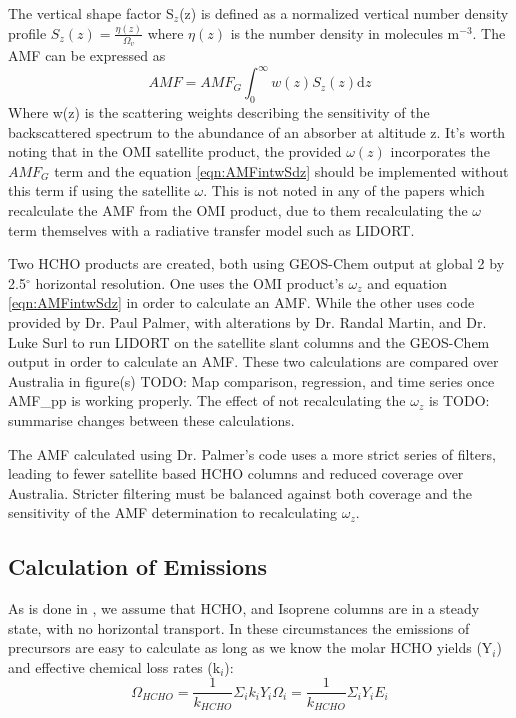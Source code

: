 \documentclass[acp, manuscript]{copernicus} %
\begin{document}
    The vertical shape factor S$_z$(z) is defined as a normalized vertical number density profile $S_z(z) = \frac{\eta(z)}{\Omega_v}$ where $\eta(z)$ is the number density in molecules m$^{-3}$. 
    The AMF can be expressed as
    \begin{equation} \label{eqn:AMFintwSdz}
      AMF = AMF_G \int_0^\infty w(z) S_z(z) \mathrm{d}z
    \end{equation}
    Where w(z) is the scattering weights describing the sensitivity of the backscattered spectrum to the abundance of an absorber at altitude z.
    It's worth noting that in the OMI satellite product, the provided $\omega(z)$ incorporates the $AMF_G$ term and the equation \ref{eqn:AMFintwSdz} should be implemented without this term if using the satellite $\omega$.
    This is not noted in any of the papers which recalculate the AMF from the OMI product, due to them recalculating the $\omega$ term themselves with a radiative transfer model such as LIDORT.
    
    Two HCHO products are created, both using GEOS-Chem output at global 2 by 2.5$^{\circ}$ horizontal resolution.
    One uses the OMI product's $\omega_z$ and equation \ref{eqn:AMFintwSdz} in order to calculate an AMF.
    While the other uses code provided by Dr. Paul Palmer, with alterations by Dr. Randal Martin, and Dr. Luke Surl to run LIDORT on the satellite slant columns and the GEOS-Chem output in order to calculate an AMF.
    These two calculations are compared over Australia in figure(s) TODO: Map comparison, regression, and time series once AMF_pp is working properly.
    The effect of not recalculating the $\omega_z$ is TODO: summarise changes between these calculations.
    
    The AMF calculated using Dr. Palmer's code uses a more strict series of filters, leading to fewer satellite based HCHO columns and reduced coverage over Australia.
    Stricter filtering must be balanced against both coverage and the sensitivity of the AMF determination to recalculating $\omega_z$.
    
  
  \subsection{Calculation of Emissions}
    \label{sec:EmissionCalculation}
    
    As is done in \citet{Palmer2003, Millet2006, Bauwens2016}, we assume that HCHO, and Isoprene columns are in a steady state, with no horizontal transport.
    In these circumstances the emissions of precursors are easy to calculate as long as we know the molar HCHO yields (Y$_i$) and effective chemical loss rates (k$_i$):
    \begin{equation}
      \Omega_{HCHO} = \frac{1}{k_{HCHO}}\Sigma_i k_i Y_i \Omega_i = \frac{1}{k_{HCHO}}\Sigma_i Y_i E_i
    \end{equation}
    
\end{document}
